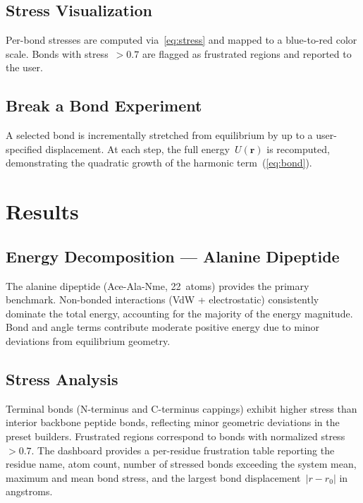 \documentclass[conference]{IEEEtran}
\begin{document}
\subsection{Stress Visualization}

Per-bond stresses are computed via~\cref{eq:stress} and mapped to a
blue-to-red color scale.  Bonds with stress~$> 0.7$ are flagged as frustrated
regions and reported to the user.

\subsection{Break a Bond Experiment}

A selected bond is incrementally stretched from equilibrium by up to a
user-specified displacement.  At each step, the full energy~$U(\mathbf{r})$ is
recomputed, demonstrating the quadratic growth of the harmonic
term~(\cref{eq:bond}).

\section{Results}

\subsection{Energy Decomposition --- Alanine Dipeptide}

The alanine dipeptide (Ace-Ala-Nme, 22~atoms) provides the primary benchmark.
Non-bonded interactions (VdW + electrostatic) consistently dominate the total
energy, accounting for the majority of the energy magnitude.  Bond and angle
terms contribute moderate positive energy due to minor deviations from
equilibrium geometry.

\subsection{Stress Analysis}

Terminal bonds (N-terminus and C-terminus cappings) exhibit higher stress than
interior backbone peptide bonds, reflecting minor geometric deviations in the
preset builders.  Frustrated regions correspond to bonds with normalized
stress~$> 0.7$.  The dashboard provides a per-residue frustration table
reporting the residue name, atom count, number of stressed bonds exceeding
the system mean, maximum and mean bond stress, and the largest bond
displacement~$|r - r_0|$ in angstroms.
\end{document}
